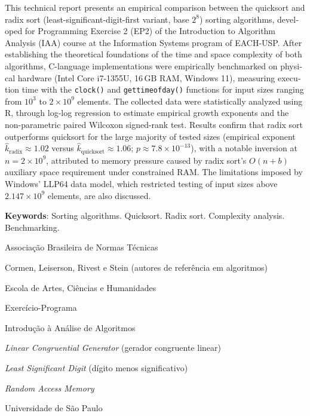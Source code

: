 \documentclass[
	12pt,
	oneside,
	a4paper,
	chapter=TITLE,
	section=TITLE,
	subsection=TITLE,
	subsubsection=TITLE,
	english,
	brazil
]{abntex2}
\theoremstyle{plain}
\theoremstyle{remark}
\renewcommand{\_}{\underscoreoriginal\allowbreak}
\begin{document}
\begin{resumo}[Abstract]
\foreignlanguage{english}{This technical report presents an empirical comparison between the quicksort and radix sort (least-significant-digit-first variant, base $2^{8}$) sorting algorithms, developed for Programming Exercise 2 (EP2) of the Introduction to Algorithm Analysis (IAA) course at the Information Systems program of EACH-USP. After establishing the theoretical foundations of the time and space complexity of both algorithms, C-language implementations were empirically benchmarked on physical hardware (Intel Core i7-1355U, 16\,GB RAM, Windows 11), measuring execution time with the \texttt{clock()} and \texttt{gettimeofday()} functions for input sizes ranging from $10^{3}$ to $2\times10^{9}$ elements. The collected data were statistically analyzed using R, through log-log regression to estimate empirical growth exponents and the non-parametric paired Wilcoxon signed-rank test. Results confirm that radix sort outperforms quicksort for the large majority of tested sizes (empirical exponent $\hat{k}_{\text{radix}} \approx 1.02$ versus $\hat{k}_{\text{quicksort}} \approx 1.06$; $p \approx 7.8\times10^{-13}$), with a notable inversion at $n = 2\times10^{9}$, attributed to memory pressure caused by radix sort's $O(n+b)$ auxiliary space requirement under constrained RAM. The limitations imposed by Windows' LLP64 data model, which restricted testing of input sizes above $2.147\times10^{9}$ elements, are also discussed.}

\vspace{\onelineskip}
\noindent
\foreignlanguage{english}{\textbf{Keywords}: Sorting algorithms. Quicksort. Radix sort. Complexity analysis. Benchmarking.}
\end{resumo}

\listoffigures*
\cleardoublepage

\listoftables*
\cleardoublepage

\begin{siglas}
	\item[ABNT] Associação Brasileira de Normas Técnicas
	\item[CLRS] Cormen, Leiserson, Rivest e Stein (autores de referência em algoritmos)
	\item[EACH] Escola de Artes, Ciências e Humanidades
	\item[EP] Exercício-Programa
	\item[IAA] Introdução à Análise de Algoritmos
	\item[LCG] \emph{Linear Congruential Generator} (gerador congruente linear)
	\item[LSD] \emph{Least Significant Digit} (dígito menos significativo)
	\item[RAM] \emph{Random Access Memory}
	\item[USP] Universidade de São Paulo
\end{siglas}
\end{document}
